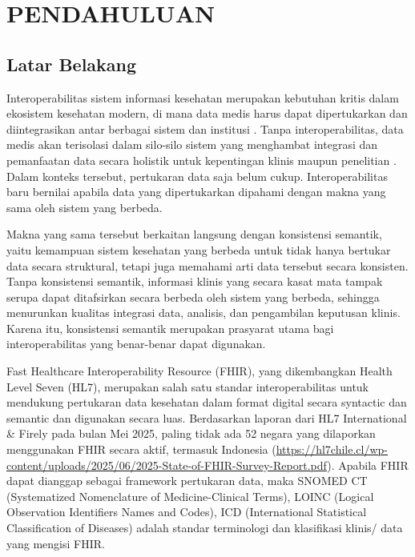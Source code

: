 \chapter{PENDAHULUAN}


\section{Latar Belakang}

Interoperabilitas sistem informasi kesehatan merupakan kebutuhan kritis dalam ekosistem kesehatan modern, di mana data medis harus dapat dipertukarkan dan diintegrasikan antar berbagai sistem dan institusi \citep{ayuningtyas_bringing_2025}. Tanpa interoperabilitas, data medis akan terisolasi dalam silo-silo sistem yang menghambat integrasi dan pemanfaatan data secara holistik untuk kepentingan klinis maupun penelitian \citep{rinaldi_towards_2023}. Dalam konteks tersebut, pertukaran data saja belum cukup. Interoperabilitas baru bernilai apabila data yang dipertukarkan dipahami dengan makna yang sama oleh sistem yang berbeda.

Makna yang sama tersebut berkaitan langsung dengan konsistensi semantik, yaitu kemampuan sistem kesehatan yang berbeda untuk tidak hanya bertukar data secara struktural, tetapi juga memahami arti data tersebut secara konsisten. Tanpa konsistensi semantik, informasi klinis yang secara kasat mata tampak serupa dapat ditafsirkan secara berbeda oleh sistem yang berbeda, sehingga menurunkan kualitas integrasi data, analisis, dan pengambilan keputusan klinis. Karena itu, konsistensi semantik merupakan prasyarat utama bagi interoperabilitas yang benar-benar dapat digunakan.

Fast Healthcare Interoperability Resource (FHIR), yang dikembangkan Health Level Seven (HL7), merupakan salah satu standar interoperabilitas untuk mendukung pertukaran data kesehatan dalam format digital secara syntactic dan semantic dan digunakan secara luas. Berdasarkan laporan dari HL7 International \& Firely pada bulan Mei 2025, paling tidak ada 52 negara yang dilaporkan menggunakan FHIR secara aktif, termasuk Indonesia (\url{https://hl7chile.cl/wp-content/uploads/2025/06/2025-State-of-FHIR-Survey-Report.pdf}). Apabila FHIR dapat dianggap sebagai framework pertukaran data, maka SNOMED CT (Systematized Nomenclature of Medicine-Clinical Terms), LOINC (Logical Observation Identifiers Names and Codes), ICD (International Statistical Classification of Diseases) adalah standar terminologi dan klasifikasi klinis/ data yang mengisi FHIR.


